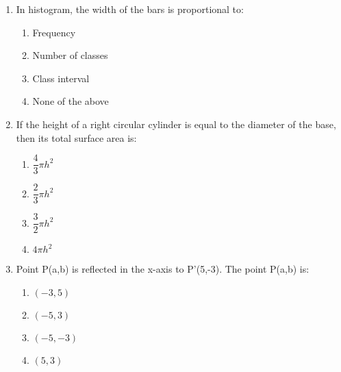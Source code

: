 \begin{enumerate}[label=(\roman*)]
    \item In histogram, the width of the bars is proportional to:

        \begin{multicols}{2}
        \begin{enumerate}[label=(\alph*)]
            \item Frequency 
            \item Number of classes
            \item Class interval
            \item None of the above 
        \end{enumerate}
        \end{multicols}

    \item If the height of a right circular cylinder is equal to the 
        diameter of the base, then its total surface area is:

        \begin{multicols}{2}
        \begin{enumerate}[label=(\alph*)]
            \item $\dfrac{4}{3} \pi h^2$
            \item $\dfrac{2}{3} \pi h^2$
            \item $\dfrac{3}{2} \pi h^2$
            \item $4 \pi h^2$
        \end{enumerate}
        \end{multicols}

    \item Point P(a,b) is reflected in the x-axis to P'(5,-3). The 
        point P(a,b) is:

        \begin{multicols}{2}
        \begin{enumerate}[label=(\alph*)]
            \item $(-3,5)$
            \item $(-5,3)$
            \item $(-5,-3)$
            \item $(5,3)$
        \end{enumerate}
        \end{multicols}


\end{enumerate}
